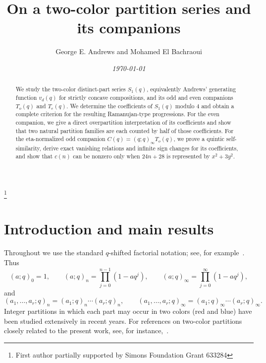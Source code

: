 \documentclass[reqno]{amsart}
\title[Two-color series]{On a two-color partition series and its companions}
\author[G. E. Andrews and M. El Bachraoui]{George E. Andrews and Mohamed El Bachraoui}
\theoremstyle{plain}
\theoremstyle{definition}
\theoremstyle{remark}
\numberwithin{equation}{section}
\newcommand{\qpoch}[2]{(#1;#2)_\infty}
\newcommand{\qpochn}[3]{(#1;#2)_{#3}}
\begin{document}
\begin{abstract}
We study the two-color distinct-part series \(S_1(q)\), equivalently Andrews' generating function \(v_d(q)\) for strictly concave compositions, and its odd and even companions \(T_o(q)\) and \(T_e(q)\). We determine the coefficients of \(S_1(q)\) modulo \(4\) and obtain a complete criterion for the resulting Ramanujan-type progressions. For the even companion, we give a direct overpartition interpretation of its coefficients and show that two natural partition families are each counted by half of those coefficients. For the eta-normalized odd companion \(C(q)=(q;q)_\infty T_o(q)\), we prove a quintic self-similarity, derive exact vanishing relations and infinite sign changes for its coefficients, and show that \(c(n)\) can be nonzero only when \(24n+28\) is represented by \(x^2+3y^2\).
\end{abstract}

\date{\textit{\today}}
\thanks{First author partially supported by Simons Foundation Grant 633284}
\maketitle

\section{Introduction and main results}\label{sec:intro}

Throughout we use the standard $q$-shifted factorial notation; see, for example~\cite[Chapter~1]{GasperRahman}. Thus
\[
(a;q)_0=1,\qquad
\qpochn{a}{q}{n}=\prod_{j=0}^{n-1}(1-aq^j),\qquad
\qpoch{a}{q}=\prod_{j=0}^{\infty}(1-aq^j),
\]
and
\[
(a_1,\dots,a_r;q)_n=(a_1;q)_n\cdots(a_r;q)_n,
\qquad
(a_1,\dots,a_r;q)_\infty=(a_1;q)_\infty\cdots(a_r;q)_\infty.
\]
Integer partitions in which each part may occur in two colors (red and blue) have been studied extensively in recent years. For references on two-color partitions closely related to the present work, see, for instance,~\cite{Andrews1987, Andrews2021, AndrewsElBachraouiPositive, AndrewsElBachraouiCongruences, AndrewsKumar, BanerjeeBringmannKeith, ChernWang}.
\end{document}
